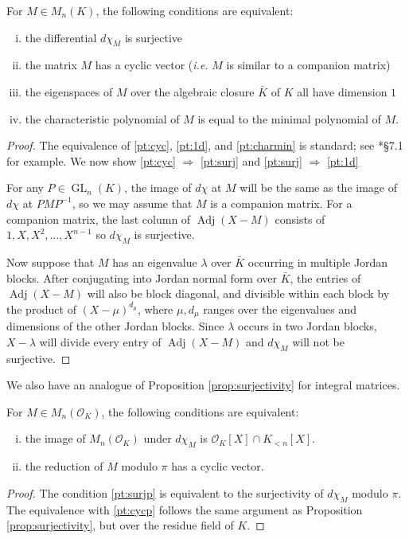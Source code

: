 \documentclass{sig-alternate-05-2015}
\DeclareMathOperator{\GL}{GL}
\DeclareMathOperator{\adj}{Adj}
\newcommand{\OK}{\mathcal{O}_K}
\begin{document}
\begin{prop}
\label{prop:surjectivity}
For $M \in M_n(K)$, the following conditions are equivalent:
\begin{enumerate}[(i)]
\renewcommand{\itemsep}{0pt}
\item \label{pt:surj} the differential $d\chi_M$ is surjective
\item \label{pt:cyc} the matrix $M$ has a cyclic vector (\emph{i.e.} $M$ is similar
to a companion matrix)
\item \label{pt:1d} the eigenspaces of $M$ over the algebraic
closure $\bar{K}$ of $K$ all have dimension $1$
\item \label{pt:charmin} the characteristic polynomial of $M$ is equal to the minimal polynomial of $M$.
\end{enumerate}
\end{prop}

\begin{proof}
The equivalence of \eqref{pt:cyc}, \eqref{pt:1d}, and \eqref{pt:charmin} is standard; see
\cite{hoffman-kunze:LinearAlgebra}*{\S 7.1} for example.  We now show
\eqref{pt:cyc} $\Rightarrow$ \eqref{pt:surj} and \eqref{pt:surj} $\Rightarrow$ \eqref{pt:1d}

For any $P \in \GL_n(K)$, the image of $d\chi$ at $M$ will be the same
as the image of $d\chi$ at $PMP^{-1}$, so we may assume that
$M$ is a companion matrix.  For a companion matrix, the last column of
$\adj(X-M)$ consists of $1, X, X^2, \dots, X^{n-1}$ so $d\chi_M$ is surjective.

Now suppose that $M$ has an eigenvalue $\lambda$ over $\bar{K}$ occurring in multiple Jordan blocks.
After conjugating into Jordan normal form over $\bar{K}$, the entries of $\adj(X-M)$
will also be block diagonal, and divisible within each block by the product of $(X-\mu)^{d_\mu}$,
where $\mu, d_\mu$ ranges over the eigenvalues and dimensions of the other Jordan blocks.
Since $\lambda$ occurs in two Jordan blocks,
$X - \lambda$ will divide every entry of $\adj(X-M)$ and $d\chi_M$ will not be surjective.
\end{proof}

We also have an analogue of Proposition \ref{prop:surjectivity} for integral matrices.

\begin{prop}
\label{prop:intsurj}
For $M \in M_n(\OK)$, the following conditions are equivalent:
\begin{enumerate}[(i)]
\renewcommand{\itemsep}{0pt}
\item \label{pt:surjp} the image of $M_n(\OK)$ under $d\chi_M$ is $\OK[X] \cap K_{<n}[X]$.
\item \label{pt:cycp} the reduction of $M$ modulo $\pi$ has a cyclic vector.
\end{enumerate}
\end{prop}
\begin{proof}
The condition \eqref{pt:surjp} is equivalent to the surjectivity of $d\chi_M$ modulo $\pi$.  The equivalence with
\eqref{pt:cycp} follows the same argument as Proposition \ref{prop:surjectivity}, but over the residue field of $K$.
\end{proof}
\end{document}
